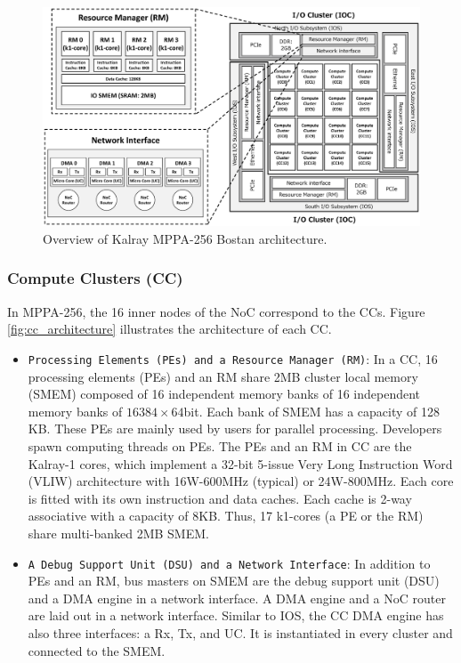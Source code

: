 \documentclass{sig-alternate-05-2015}
\begin{document}
\begin{figure}[t]
  \centering
  \includegraphics[width=1.0\linewidth]{../figure/mppa_architecture.eps}
  \caption{\label{fig:mppa_architecture}
    Overview of Kalray MPPA-256 Bostan architecture.}
\end{figure}

\subsubsection{Compute Clusters (CC)}
\label{sec:cc}
In MPPA-256, the 16 inner nodes of the NoC correspond to the CCs.
Figure \ref{fig:cc_architecture} illustrates the architecture of each CC.

\begin{itemize}
\item \verb+Processing Elements (PEs) and a Resource Manager (RM)+:
In a CC, 16 processing elements (PEs) and an RM share 2MB cluster local memory (SMEM) composed of 16 independent memory banks of 16 independent memory banks of $16384\times 64 $bit.
Each bank of SMEM has a capacity of 128 KB.
These PEs are mainly used by users for parallel processing.
Developers spawn computing threads on PEs.
The PEs and an RM in CC are the Kalray-1 cores, which implement a 32-bit 5-issue Very Long Instruction Word (VLIW) architecture with 16W-600MHz (typical) or 24W-800MHz.
Each core is fitted with its own instruction and data caches.
Each cache is 2-way associative with a capacity of 8KB.
Thus, 17 k1-cores (a PE or the RM) share multi-banked 2MB SMEM.

\item \verb+A Debug Support Unit (DSU) and a Network Interface+:
In addition to PEs and an RM, bus masters on SMEM are the debug support unit (DSU) and a DMA engine in a network interface.
A DMA engine and a NoC router are laid out in a network interface.
Similar to IOS, the CC DMA engine has also three interfaces: a Rx, Tx, and UC. 
It is instantiated in every cluster and connected to the SMEM.
\end{itemize}
\end{document}
